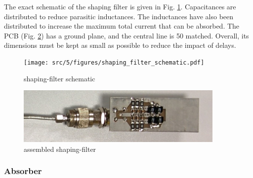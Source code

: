 The exact schematic of the shaping filter is given in Fig. \ref{fig:shaping_filter_schematic}.
Capacitances are distributed to reduce parasitic inductances.
The inductances have also been distributed to increase the maximum total current that can be absorbed.
The PCB (Fig. \ref{pic:shaping_filter_assembled}) has a ground plane, and the central line is 50\textOmega{} matched.
Overall, its dimensions must be kept as small as possible to reduce the impact of delays.

\begin{figure}[!h]
  \centering
  \texttt{[image: src/5/figures/shaping\_filter\_schematic.pdf]}
  \caption{shaping-filter schematic}
  \label{fig:shaping_filter_schematic}
\end{figure}

\begin{figure}[!h]
  \centering
  \includegraphics[width=0.9\textwidth]{src/5/figures/filter.jpg}
  \caption{assembled shaping-filter}
  \label{pic:shaping_filter_assembled}
\end{figure}


\subsubsection{Absorber}

